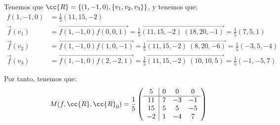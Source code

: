 \documentclass[12pt]{article}
\begin{document}
\begin{ejercicio}[4 puntos]
\begin{enumerate}
            Tenemos que $\cc{R}=\{(1,-1,0), \{v_1, v_2, v_3\}\}$, y tenemos que:
            \begin{align*}
                f(1,-1,0) &= \frac{1}{5}(11,15,-2) \\
                \vec{f}(v_1) &= \vec{f(1,-1,0)f(0,0,1)} = \frac{1}{5} \vec{(11,15,-2)~(18,20,-1)} = \frac{1}{5}(7,5,1) \\
                \vec{f}(v_2) &= \vec{f(1,-1,0)f(1,0,-1)} = \frac{1}{5} \vec{(11,15,-2)~(8,20,-6)} = \frac{1}{5}(-3,5,-4) \\
                \vec{f}(v_3) &= \vec{f(1,-1,0)f(2,-2,1)} = \frac{1}{5} \vec{(11,15,-2)~(10,10,5)} = \frac{1}{5}(-1,-5,7)
            \end{align*}

            Por tanto, tenemos que:
            \begin{equation*}
                M(f,\cc{R}, \cc{R}_0) = \frac{1}{5}\left(
                    \begin{array}{c|ccc}
                        5 & 0 & 0 & 0\\ \hline
                        11 & 7 & -3 & -1\\
                        15 & 5 & 5 & -5\\
                        -2 & 1 & -4 & 7
                    \end{array}
                \right)
            \end{equation*}


\end{enumerate}
\end{ejercicio}
\end{document}
